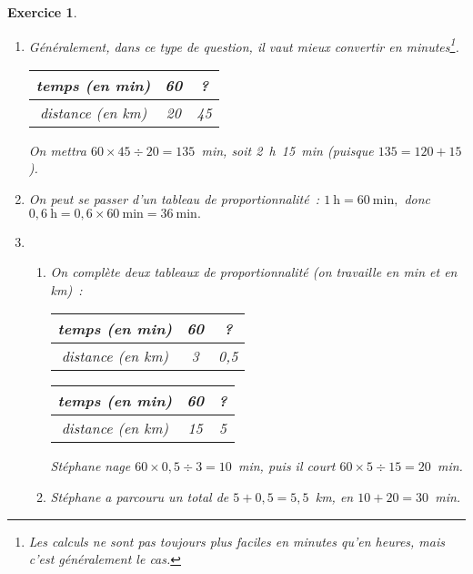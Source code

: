\documentclass[10pt]{article}
\newtheorem{exo}{Exercice}
\begin{document}
\begin{exo}


\begin{enumerate}

\item Généralement, dans ce type de question, il vaut mieux convertir en minutes\footnote{Les calculs ne sont pas toujours plus faciles en minutes qu'en heures, mais c'est généralement le cas.}.

\begin{center}
\begin{tabular}{|c|c|c|}\hline
temps (en min)& 60&? \\ \hline 
distance (en km)&20& 45 \\ \hline
\end{tabular}
\end{center}

On mettra $60\times 45\div 20=135$~min, soit 2~h~15~min (puisque $135=120+15$).

\item On peut se passer d'un tableau de proportionnalité~: $1~\text{h}=60~\text{min},$ donc $0,6~\text{h}=0,6\times 60~\text{min}=36~\text{min}.$

\item \begin{enumerate}
\item On complète deux tableaux de proportionnalité (on travaille en min et en km)~:

\begin{multicols}{2}

\begin{center}
\begin{tabular}{|c|c|c|}\hline
temps (en min)& 60&? \\ \hline 
distance (en km)&3& 0,5 \\ \hline
\end{tabular}


\begin{tabular}{|c|c|c|}\hline
temps (en min)& 60&? \\ \hline 
distance (en km)&15& 5 \\ \hline
\end{tabular}
\end{center}

\end{multicols}

Stéphane nage $60\times 0,5 \div 3=10$~min, puis il court $60\times 5\div 15=20$~min.


\item Stéphane a parcouru un total de $5+0,5=5,5$~km, en $10+20=30$~min.


\end{enumerate}
\end{enumerate}
\end{exo}
\end{document}
